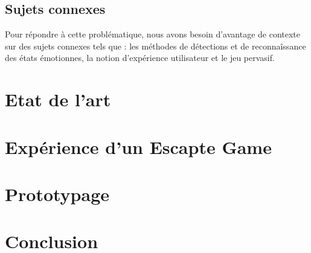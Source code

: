 \documentclass{article}
\begin{document}
	\subsection{Sujets connexes}
		Pour répondre à cette problématique, nous avons besoin d'avantage de contexte sur des sujets connexes tels que : les méthodes de détections et de reconnaîssance des états émotionnes, la notion d'expérience utilisateur et le jeu pervasif.

\section{Etat de l'art}

\section{Expérience d'un Escapte Game}

\section{Prototypage}

\section{Conclusion}



\newpage
\appendix
\end{document}
